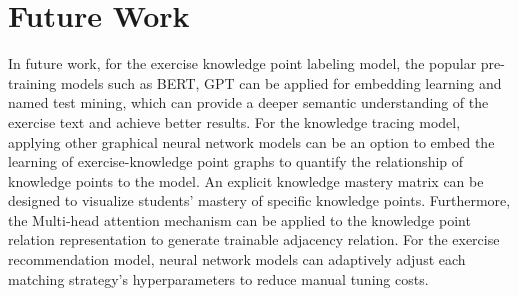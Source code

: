 \section{Future Work}
In future work, for the exercise knowledge point labeling model, the popular pre-training models such as BERT, GPT can be applied for embedding learning and named test mining, which can provide a deeper semantic understanding of the exercise text and achieve better results. For the knowledge tracing model, applying other graphical neural network models can be an option to embed the learning of exercise-knowledge point graphs to quantify the relationship of knowledge points to the model. An explicit knowledge mastery matrix can be designed to visualize students' mastery of specific knowledge points. Furthermore, the Multi-head attention mechanism can be applied to the knowledge point relation representation to generate trainable adjacency relation. For the exercise recommendation model, neural network models can adaptively adjust each matching strategy's hyperparameters to reduce manual tuning costs.